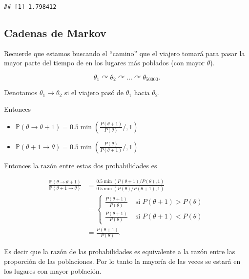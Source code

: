 \documentclass[
  12pt,
]{book}
\providecommand{\tightlist}{%
  \setlength{\itemsep}{0pt}\setlength{\parskip}{0pt}}
\theoremstyle{definition}
\theoremstyle{definition}
\theoremstyle{definition}
\theoremstyle{remark}
\begin{document}
\begin{verbatim}
## [1] 1.798412
\end{verbatim}

\hypertarget{cadenas-de-markov}{%
\subsection{Cadenas de Markov}\label{cadenas-de-markov}}

Recuerde que estamos buscando el \enquote{camino} que el viajero tomará para pasar la mayor parte del tiempo de en los lugares más poblados (con mayor \(\theta\)).

\begin{equation*}
\theta_{1} \curvearrowright \theta_{2} \curvearrowright \ldots \curvearrowright \theta_{50000}.
\end{equation*}

Denotamos \(\theta_{1}\to\theta_{2}\) si el viajero pasó de \(\theta_{1}\) hacia \(\theta_{2}\).

Entonces

\begin{itemize}
\tightlist
\item
  \(\mathbb{P}\left(\theta \rightarrow \theta+1\right)=0.5 \min \left(\frac{P(\theta+1)}{P(\theta)} / , 1\right)\)
\item
  \(\mathbb{P}\left(\theta + 1 \rightarrow \theta\right)=0.5 \min \left(\frac{P(\theta)}{P(\theta+1)} / , 1\right)\)
\end{itemize}

Entonces la razón entre estas dos probabilidades es

\begin{align*}
    \frac{\mathbb{P}\left(\theta \rightarrow \theta+1\right)}{\mathbb{P}\left(\theta +1 \rightarrow \theta\right)}
      & =\frac{0.5 \min (P(\theta+1) / P(\theta), 1)}{0.5 \min (P(\theta) / P(\theta+1), 1)} \\
      & =\left\{\begin{array}{ll}
        \frac{P(\theta+1)}{P(\theta) }
          & \text { si } P(\theta+1)>P(\theta) \\
        \frac{P(\theta+1) }{P(\theta)}
          & \text { si } P(\theta+1)<P(\theta)
    \end{array}\right.                                             \\
    \, & =\frac{P(\theta+1)}{P(\theta)}.
\end{align*}

Es decir que la razón de las probabilidades es equivalente a la razón entre las proporción de las poblaciones. Por lo tanto la mayoría de las veces se estará en los lugares con mayor población.
\end{document}
